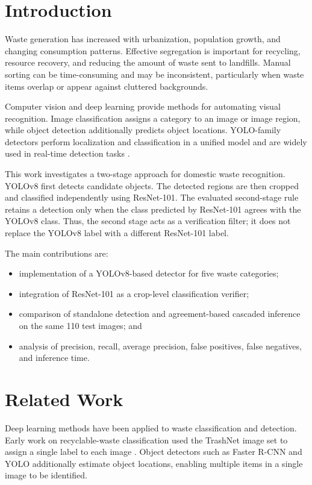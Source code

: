 \documentclass[conference]{IEEEtran}
\begin{document}
\section{Introduction}
Waste generation has increased with urbanization, population growth, and changing consumption patterns. Effective segregation is important for recycling, resource recovery, and reducing the amount of waste sent to landfills. Manual sorting can be time-consuming and may be inconsistent, particularly when waste items overlap or appear against cluttered backgrounds.

Computer vision and deep learning provide methods for automating visual recognition. Image classification assigns a category to an image or image region, while object detection additionally predicts object locations. YOLO-family detectors perform localization and classification in a unified model and are widely used in real-time detection tasks \cite{redmon2016yolo,jocher2023yolov8}.

This work investigates a two-stage approach for domestic waste recognition. YOLOv8 first detects candidate objects. The detected regions are then cropped and classified independently using ResNet-101. The evaluated second-stage rule retains a detection only when the class predicted by ResNet-101 agrees with the YOLOv8 class. Thus, the second stage acts as a verification filter; it does not replace the YOLOv8 label with a different ResNet-101 label.

The main contributions are:
\begin{itemize}
  \item implementation of a YOLOv8-based detector for five waste categories;
  \item integration of ResNet-101 as a crop-level classification verifier;
  \item comparison of standalone detection and agreement-based cascaded inference on the same 110 test images; and
  \item analysis of precision, recall, average precision, false positives, false negatives, and inference time.
\end{itemize}

\section{Related Work}
Deep learning methods have been applied to waste classification and detection. Early work on recyclable-waste classification used the TrashNet image set to assign a single label to each image \cite{yang2016trashnet}. Object detectors such as Faster R-CNN \cite{ren2017fasterrcnn} and YOLO \cite{redmon2016yolo} additionally estimate object locations, enabling multiple items in a single image to be identified.
\end{document}
